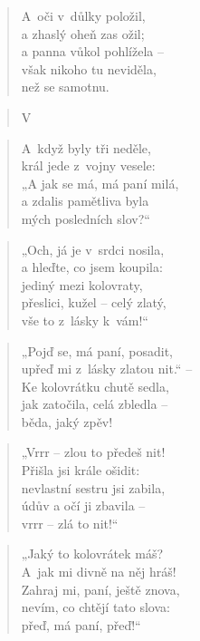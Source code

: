 \begin{verse}
A~oči v~důlky položil, \\
a zhaslý oheň zas ožil; \\
a panna vůkol pohlížela -- \\
však nikoho tu neviděla, \\
než se samotnu.
\end{verse}

\begin{verse}
V~\end{verse}

\begin{verse}
A~když byly tři neděle, \\
král jede z~vojny vesele: \\
„A jak se má, má paní milá, \\
a zdalis pamětliva byla \\
mých posledních slov?“
\end{verse}

\begin{verse}
„Och, já je v~srdci nosila, \\
a hleďte, co jsem koupila: \\
jediný mezi kolovraty, \\
přeslici, kužel -- celý zlatý, \\
vše to z~lásky k~vám!“
\end{verse}

\begin{verse}
„Pojď se, má paní, posadit, \\
upřeď mi z~lásky zlatou nit.“ -- \\
Ke kolovrátku chutě sedla, \\
jak zatočila, celá zbledla -- \\
běda, jaký zpěv!
\end{verse}

\begin{verse}
„Vrrr -- zlou to předeš nit! \\
Přišla jsi krále ošidit: \\
nevlastní sestru jsi zabila, \\
údův a očí ji zbavila -- \\
vrrr -- zlá to nit!“
\end{verse}

\begin{verse}
„Jaký to kolovrátek máš? \\
A~jak mi divně na něj hráš! \\
Zahraj mi, paní, ještě znova, \\
nevím, co chtějí tato slova: \\
přeď, má paní, přeď!“
\end{verse}

